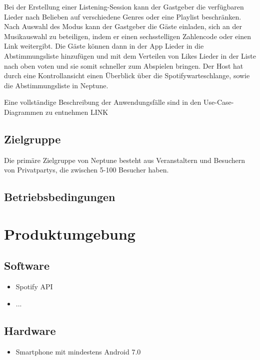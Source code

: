 \documentclass[oneside, ngerman]{sdqtechreport}
\begin{document}
Bei der Erstellung einer Listening-Session kann der Gastgeber die verfügbaren Lieder nach Belieben auf verschiedene Genres oder eine Playlist beschränken. Nach Auswahl des Modus kann der Gastgeber die Gäste einladen, sich an der Musikauswahl zu beteiligen, indem er einen sechsstelligen Zahlencode oder einen Link weitergibt. Die Gäste können dann in der App Lieder in die Abstimmungsliste hinzufügen und mit dem Verteilen von Likes Lieder in der Liste nach oben voten und sie somit schneller zum Abspielen bringen. Der Host hat durch eine Kontrollansicht einen Überblick über die Spotifywarteschlange, sowie die Abstimmungsliste in Neptune. 

Eine vollständige Beschreibung der Anwendungsfälle sind in den Use-Case-Diagrammen zu entnehmen   LINK 

\section{Zielgruppe}
\label{sec:Produkteinsatz:Zielgruppe}
\textbf{}
Die primäre Zielgruppe von Neptune besteht aus Veranstaltern und Besuchern von Privatpartys, die zwischen 5-100 Besucher haben.  


\section{Betriebsbedingungen}
\label{sec:Produkteinsatz:Betriebsbedingungen}



\chapter{Produktumgebung}
\label{chap:Produktumgebung}

\section{Software}
\label{sec:Produktumgebung:Software}

\begin{itemize}
    \item Spotify API
    \item ...
\end{itemize}

\section{Hardware}
\label{sec:Produktumgebung:Hardware}

\begin{itemize}
    \item Smartphone mit mindestens Android 7.0
\end{itemize}
\end{document}
